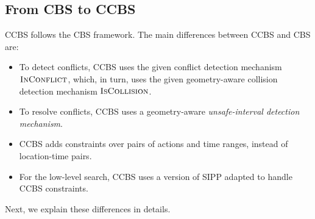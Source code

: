 \documentclass[review]{elsarticle}
\newcommand\konstantin[1]{\nb{\textbf{Konstantin:}}{red}{#1}}
\newcommand\roni[1]{\nb{\textbf{Roni:}}{green}{#1}}
\newcommand{\ccbs}{\ac{CCBS}\xspace}
\newcommand{\cbs}{\ac{CBS}\xspace}
\newcommand{\sipp}{\ac{SIPP}\xspace}
\newcommand{\iscollision}{\textsc{IsCollision}\xspace}
\newcommand{\inconflict}{\textsc{InConflict}\xspace}
\begin{document}
\subsection{From \cbs to \ccbs}

\ccbs follows the \cbs framework. %
The main differences between \ccbs and \cbs are:
\begin{itemize}
    \item To detect conflicts, \ccbs uses the given conflict detection mechanism $\inconflict$, which, in turn, uses the given geometry-aware collision detection mechanism $\iscollision$. 
    
    
    \item To resolve conflicts, \ccbs uses a geometry-aware \emph{unsafe-interval detection mechanism}.
    \item \ccbs adds constraints over pairs of actions and time ranges, instead of location-time pairs.
    \item For the low-level search, \ccbs uses a version of \sipp adapted to handle \ccbs constraints. %
    
\end{itemize}
\noindent Next, we explain these differences in details. 
\end{document}

